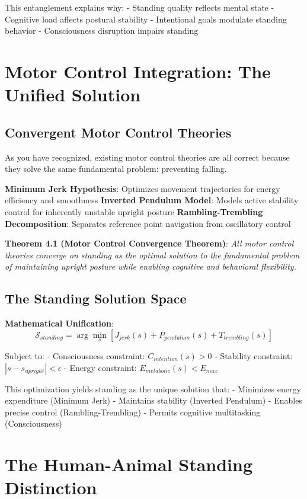 \documentclass[12pt]{article}
\begin{document}
This entanglement explains why:
- Standing quality reflects mental state
- Cognitive load affects postural stability
- Intentional goals modulate standing behavior
- Consciousness disruption impairs standing

\section{Motor Control Integration: The Unified Solution}

\subsection{Convergent Motor Control Theories}

As you have recognized, existing motor control theories are all correct because they solve the same fundamental problem: preventing falling.

\textbf{Minimum Jerk Hypothesis}: Optimizes movement trajectories for energy efficiency and smoothness
\textbf{Inverted Pendulum Model}: Models active stability control for inherently unstable upright posture
\textbf{Rambling-Trembling Decomposition}: Separates reference point navigation from oscillatory control

\textbf{Theorem 4.1 (Motor Control Convergence Theorem)}: \emph{All motor control theories converge on standing as the optimal solution to the fundamental problem of maintaining upright posture while enabling cognitive and behavioral flexibility.}

\subsection{The Standing Solution Space}

\textbf{Mathematical Unification}:
$$\mathcal{S}_{standing} = \arg\min_{s} \left[ J_{jerk}(s) + P_{pendulum}(s) + T_{trembling}(s) \right]$$

Subject to:
- Consciousness constraint: $C_{intention}(s) > 0$
- Stability constraint: $|s - s_{upright}| < \epsilon$
- Energy constraint: $E_{metabolic}(s) < E_{max}$

This optimization yields standing as the unique solution that:
- Minimizes energy expenditure (Minimum Jerk)
- Maintains stability (Inverted Pendulum)
- Enables precise control (Rambling-Trembling)
- Permits cognitive multitasking (Consciousness)

\section{The Human-Animal Standing Distinction}
\end{document}
